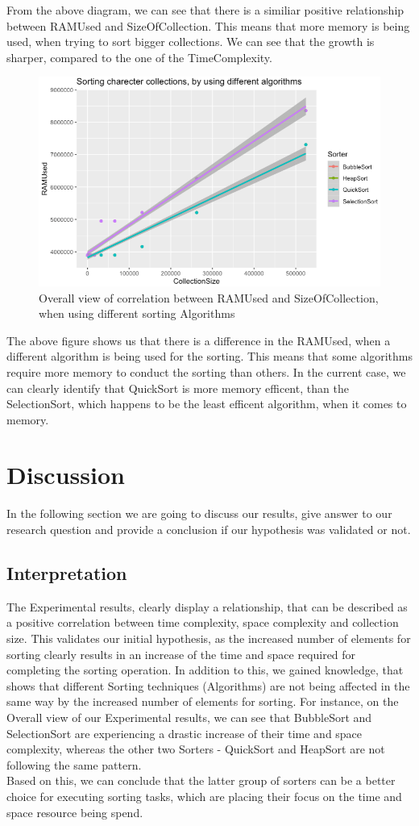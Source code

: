 \documentclass[]{report}
\begin{document}
	From the above diagram, we can see that there is a similiar positive relationship between RAMUsed and SizeOfCollection. This means that more memory is being used, when trying to sort bigger collections. We can see that the growth is sharper, compared to the one of the TimeComplexity.
			\begin{figure}[h]
		\centering
		\includegraphics[width=0.7\linewidth]{differentAlgorithmsRAM}
		\caption[Figure 3.5]{Overall view of correlation between RAMUsed and SizeOfCollection, when using different sorting Algorithms}
	\end{figure}

	The above figure shows us that there is a difference in the RAMUsed, when a different algorithm is being used for the sorting. This means that some algorithms require more memory to conduct the sorting than others. In the current case, we can clearly identify that QuickSort is more memory efficent, than the SelectionSort, which happens to be the least efficent algorithm, when it comes to memory.
\section{Discussion}
In the following section we are going to discuss our results, give answer to our research question and provide a conclusion if our hypothesis was validated or not.
\subsection{Interpretation}
The Experimental results, clearly display a relationship, that can be described as a positive correlation between time complexity, space complexity and collection size. This validates our initial hypothesis, as the increased number of elements for sorting clearly results in an increase of the time and space required for completing the sorting operation. In addition to this, we gained knowledge, that shows that different Sorting techniques (Algorithms) are not being affected in the same way by the increased number of elements for sorting. For instance, on the Overall view of our Experimental results, we can see that BubbleSort and SelectionSort are experiencing a drastic increase of their time and space complexity, whereas the other two Sorters - QuickSort and HeapSort are not following the same pattern.\\
Based on this, we can conclude that the latter group of sorters can be a better choice for executing sorting tasks, which are placing their focus on the time and space resource being spend.
\end{document}
